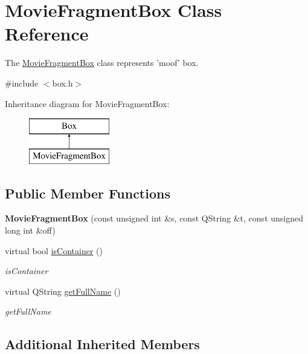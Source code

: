 \hypertarget{class_movie_fragment_box}{\section{Movie\-Fragment\-Box Class Reference}
\label{class_movie_fragment_box}
}


The \hyperlink{class_movie_fragment_box}{Movie\-Fragment\-Box} class represents 'moof' box.  




{\ttfamily \#include $<$box.\-h$>$}

Inheritance diagram for Movie\-Fragment\-Box\-:\begin{figure}[H]
\begin{center}
\leavevmode
\includegraphics[height=2.000000cm]{class_movie_fragment_box}
\end{center}
\end{figure}
\subsection*{Public Member Functions}
\begin{DoxyCompactItemize}
\item 
\hypertarget{class_movie_fragment_box_aab2f4428e74c543fffc03bbcd27b0580}{{\bfseries Movie\-Fragment\-Box} (const unsigned int \&s, const Q\-String \&t, const unsigned long int \&off)}\label{class_movie_fragment_box_aab2f4428e74c543fffc03bbcd27b0580}

\item 
virtual bool \hyperlink{class_movie_fragment_box_a10e2f1d3c5dc5c87fcbd35f88601af55}{is\-Container} ()
\begin{DoxyCompactList}\small\item\em is\-Container \end{DoxyCompactList}\item 
virtual Q\-String \hyperlink{class_movie_fragment_box_a496f11dd218973b9eabc0d033cf489f5}{get\-Full\-Name} ()
\begin{DoxyCompactList}\small\item\em get\-Full\-Name \end{DoxyCompactList}\end{DoxyCompactItemize}
\subsection*{Additional Inherited Members}


